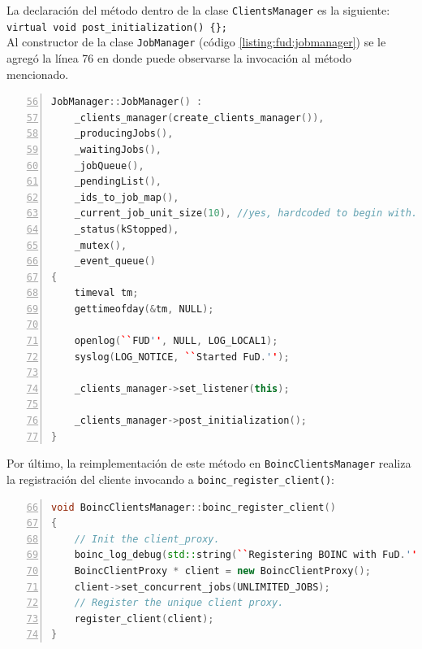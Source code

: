 La declaración del método dentro de la clase \texttt{ClientsManager} es la siguiente:\\

\texttt{virtual void post\_initialization() \{\};}\\

Al constructor de la clase \texttt{JobManager} (código \ref{listing:fud:jobmanager}) se le agregó la línea 76 en donde puede observarse la invocación al método mencionado.

\begin{lstlisting}[frame=shadowbox, language=C++, numbers=left, xleftmargin=8mm, framexleftmargin=22pt, basicstyle=\scriptsize, numberstyle=\footnotesize, breaklines=true, breakatwhitespace=false, captionpos=b, caption={Código del constructor de la clase \texttt{JobManager}}, label=listing:fud:jobmanager, backgroundcolor=\color{gris}, firstnumber=56, keywordstyle=\color{Blue}]
JobManager::JobManager() :
    _clients_manager(create_clients_manager()),
    _producingJobs(),
    _waitingJobs(),
    _jobQueue(),
    _pendingList(),
    _ids_to_job_map(),
    _current_job_unit_size(10), //yes, hardcoded to begin with.
    _status(kStopped),
    _mutex(),
    _event_queue()
{
    timeval tm;
    gettimeofday(&tm, NULL);

    openlog(``FUD'', NULL, LOG_LOCAL1);
    syslog(LOG_NOTICE, ``Started FuD.'');

    _clients_manager->set_listener(this);

    _clients_manager->post_initialization();
}
\end{lstlisting}

Por último, la reimplementación de este método en \texttt{BoincClientsManager} realiza la registración del cliente invocando a \texttt{boinc\_register\_client()}:

\begin{lstlisting}[frame=shadowbox, language=C++, numbers=left, xleftmargin=8mm, framexleftmargin=22pt, basicstyle=\scriptsize, numberstyle=\footnotesize, breaklines=true, breakatwhitespace=false, captionpos=b, caption={Código del método \texttt{boinc\_register\_client()} de la clase \texttt{BoincClientsManager}}, label=listing:BoincClientsManager:boinc:register:client, backgroundcolor=\color{gris}, firstnumber=66, keywordstyle=\color{Blue}]
void BoincClientsManager::boinc_register_client()
{
    // Init the client_proxy.
    boinc_log_debug(std::string(``Registering BOINC with FuD.''));
    BoincClientProxy * client = new BoincClientProxy();
    client->set_concurrent_jobs(UNLIMITED_JOBS);
    // Register the unique client proxy.
    register_client(client);
}
\end{lstlisting}


